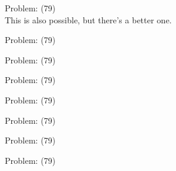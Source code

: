 \documentclass[11pt]{article}
\begin{document}
\begin{minipage}[t]{0.5\textwidth}
  {\centering
  
  Problem: (79)\\
  This is also possible, but there's a better one.\\
  }
\end{minipage}
\begin{minipage}[t]{0.5\textwidth}
  {\centering
  
  Problem: (79)\\
  
  }
\end{minipage}
\begin{minipage}[t]{0.5\textwidth}
  {\centering
  
  Problem: (79)\\
  
  }
\end{minipage}
\begin{minipage}[t]{0.5\textwidth}
  {\centering
  
  Problem: (79)\\
  
  }
\end{minipage}
\begin{minipage}[t]{0.5\textwidth}
  {\centering
  
  Problem: (79)\\
  
  }
\end{minipage}
\begin{minipage}[t]{0.5\textwidth}
  {\centering
  
  Problem: (79)\\
  
  }
\end{minipage}
\begin{minipage}[t]{0.5\textwidth}
  {\centering
  
  Problem: (79)\\
  
  }
\end{minipage}
\begin{minipage}[t]{0.5\textwidth}
  {\centering
  
  Problem: (79)\\
  
  }
\end{minipage}
\end{document}
